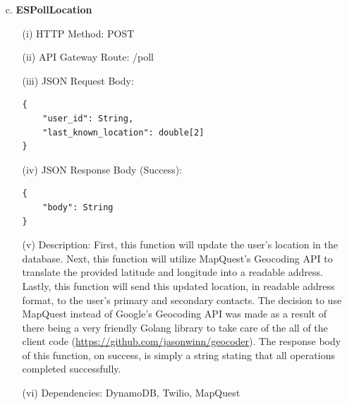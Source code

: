 \documentclass[10pt, a4paper]{article}
\begin{document}
\begin{enumerate}
	\item[c.] \textbf{ESPollLocation}
		\begin{itemize}		
		\item[(i)] HTTP Method: POST
		\item[(ii)] API Gateway Route: /poll
		\item[(iii)] JSON Request Body:
			\begin{lstlisting}
{
    "user_id": String,
    "last_known_location": double[2]
}
			\end{lstlisting}
		\item[(iv)] JSON Response Body (Success):
			\begin{lstlisting}
{
	"body": String
}
			\end{lstlisting}
		\item[(v)] Description: First, this function will update the user's location in the database. Next, this function will utilize MapQuest's Geocoding API to translate the provided latitude and longitude into a readable address. Lastly, this function will send this updated location, in readable address format, to the user's primary and secondary contacts. The decision to use MapQuest instead of Google's Geocoding API was made as a result of there being a very friendly Golang library to take care of the all of the client code (\url{https://github.com/jasonwinn/geocoder}). The response body of this function, on success, is simply a string stating that all operations completed successfully.
		\item[(vi)] Dependencies: DynamoDB, Twilio, MapQuest
		\end{itemize}
	

\end{enumerate}
\end{document}

